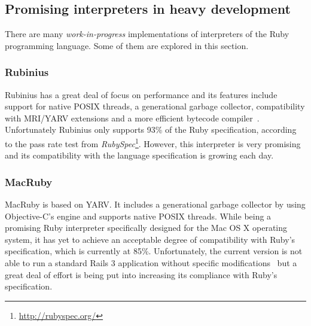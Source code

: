 \subsection{Promising interpreters in heavy development}

There are many \textit{work-in-progress} implementations of interpreters of the Ruby programming language. Some of them are explored in this section.

\subsubsection{Rubinius}

Rubinius has a great deal of focus on performance and its features include support for native POSIX threads, a generational garbage collector, compatibility with MRI/YARV extensions and a more efficient bytecode compiler~\cite{rubinius, rubinius_virtual_machine, rubinius_virtual_machine_rewrite}. Unfortunately Rubinius only supports 93\% of the Ruby specification, according to the pass rate test from \textit{RubySpec}\footnote{\url{http://rubyspec.org/}}. However, this interpreter is very promising and its compatibility with the language specification is growing each day.


\subsubsection{MacRuby}

MacRuby is based on YARV. It includes a generational garbage collector by using Objective-C's engine and supports native POSIX threads. While being a promising Ruby interpreter specifically designed for the Mac OS X operating system, it has yet to achieve an acceptable degree of compatibility with Ruby's specification, which is currently at 85\%. Unfortunately, the current version is not able to run a standard Rails 3 application without specific modifications~\cite{macruby_06} but a great deal of effort is being put into increasing its compliance with Ruby's specification.
